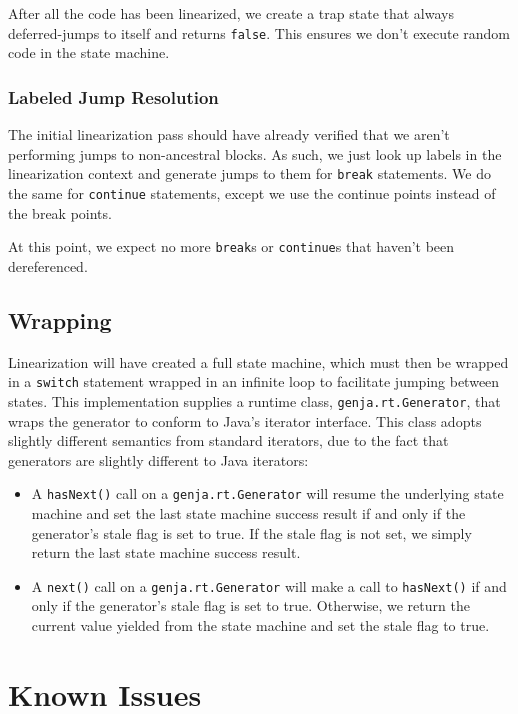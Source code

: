 \documentclass[journal,a4paper]{IEEEtran}
\begin{document}
After all the code has been linearized, we create a trap state that always deferred-jumps to itself
and returns \texttt{false}. This ensures we don't execute random code in the state machine.

\subsubsection{Labeled Jump Resolution}

The initial linearization pass should have already verified that we aren't performing jumps to
non-ancestral blocks. As such, we just look up labels in the linearization context and generate
jumps to them for \texttt{break} statements. We do the same for \texttt{continue} statements,
except we use the continue points instead of the break points.

At this point, we expect no more \texttt{break}s or \texttt{continue}s that haven't been
dereferenced.

\subsection{Wrapping}

Linearization will have created a full state machine, which must then be wrapped in a
\texttt{switch} statement wrapped in an infinite loop to facilitate jumping between states. This
implementation supplies a runtime class, \texttt{genja.rt.Generator}, that wraps the generator to
conform to Java's iterator interface. This class adopts slightly different semantics from standard
iterators, due to the fact that generators are slightly different to Java iterators:

\begin{itemize}
\item A \texttt{hasNext()} call on a \texttt{genja.rt.Generator} will resume the underlying state
machine and set the last state machine success result if and only if the generator's stale flag is
set to true. If the stale flag is not set, we simply return the last state machine success result.

\item A \texttt{next()} call on a \texttt{genja.rt.Generator} will make a call to
\texttt{hasNext()} if and only if the generator's stale flag is set to true. Otherwise, we return
the current value yielded from the state machine and set the stale flag to true.
\end{itemize}

\section{Known Issues}
\end{document}
